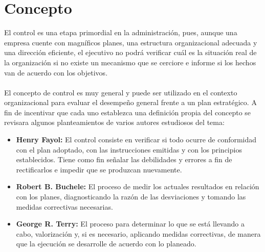 \documentclass[12pt,letterpaper]{article}
\begin{document}
\section{Concepto}
El control es una etapa primordial en la administración, pues, aunque una empresa cuente con magníficos planes, una estructura organizacional adecuada y una dirección eficiente, el ejecutivo no podrá verificar cuál es la situación real de la organización si no existe un mecanismo que se cerciore e informe si los hechos van de acuerdo con los objetivos.\\${ }$\\
El concepto de control es muy general y puede ser utilizado en el contexto organizacional para evaluar el desempeño general frente a un plan estratégico.
A fin de incentivar que cada uno establezca una definición propia del concepto se revisara algunos planteamientos de varios autores estudiosos del tema:
\begin{itemize}
\item \textbf{Henry Fayol:} El control consiste en verificar si todo ocurre de conformidad con el plan adoptado, con las instrucciones emitidas y con los principios establecidos. Tiene como fin señalar las debilidades y errores a fin de rectificarlos e impedir que se produzcan nuevamente.
\item \textbf{Robert B. Buchele:} El proceso de medir los actuales resultados en relación con los planes, diagnosticando la razón de las desviaciones y tomando las medidas correctivas necesarias.
\item \textbf{George R. Terry:} El proceso para determinar lo que se está llevando a cabo, valorización y, si es necesario, aplicando medidas correctivas, de manera que la ejecución se desarrolle de acuerdo con lo planeado.
\end{itemize}
\end{document}
